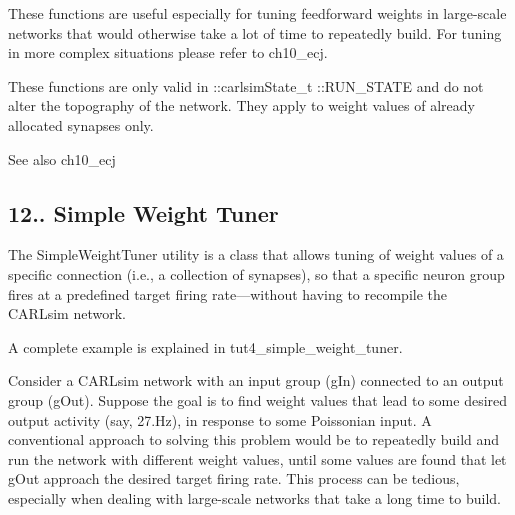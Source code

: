 These functions are useful especially for tuning feedforward weights in large-\/scale networks that would otherwise take a lot of time to repeatedly build. For tuning in more complex situations please refer to ch10\+\_\+ecj.

These functions are only valid in \+::carlsim\+State\+\_\+t \+::\+R\+U\+N\+\_\+\+S\+T\+A\+TE and do not alter the topography of the network. They apply to weight values of already allocated synapses only.

\begin{DoxySeeAlso}{See also}
ch10\+\_\+ecj
\end{DoxySeeAlso}
\hypertarget{ch12_advanced_topics_ch12s4s1_simple_weight_tuner}{}\subsection{12.. Simple Weight Tuner}\label{ch12_advanced_topics_ch12s4s1_simple_weight_tuner}
The Simple\+Weight\+Tuner utility is a class that allows tuning of weight values of a specific connection (i.\+e., a collection of synapses), so that a specific neuron group fires at a predefined target firing rate---without having to recompile the C\+A\+R\+Lsim network.

A complete example is explained in tut4\+\_\+simple\+\_\+weight\+\_\+tuner.

Consider a C\+A\+R\+Lsim network with an input group ({\ttfamily g\+In}) connected to an output group ({\ttfamily g\+Out}). Suppose the goal is to find weight values that lead to some desired output activity (say, 27.\+Hz), in response to some Poissonian input. A conventional approach to solving this problem would be to repeatedly build and run the network with different weight values, until some values are found that let {\ttfamily g\+Out} approach the desired target firing rate. This process can be tedious, especially when dealing with large-\/scale networks that take a long time to build.

